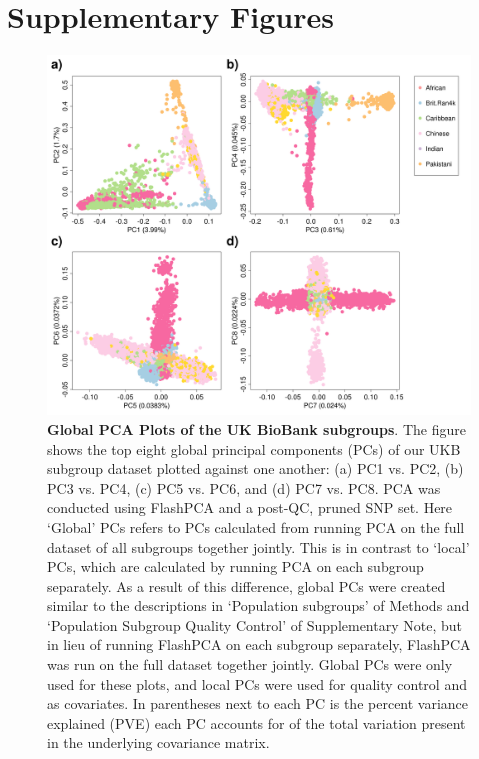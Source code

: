 \documentclass[12pt,a4paper]{article}
\begin{document}
\clearpage


\section{Supplementary Figures}\label{Supplementary-Figures}

\renewcommand{\figurename}{Supplementary Figure}
\renewcommand{\tablename}{Supplementary Table}
\setcounter{figure}{0}
\setcounter{table}{0}

\begin{figure}[htbp]
\centering
\hspace*{-1cm}
\includegraphics[scale=.4]{Images/Supp/InterPath_Supp_Figure_UKB_PCAPlot_vs2.png}
\caption[TBD]{\textbf{Global PCA Plots of the UK BioBank subgroups}. The figure shows the top eight global principal components (PCs) of our UKB subgroup dataset plotted against one another: (a) PC1 vs. PC2, (b) PC3 vs. PC4, (c) PC5 vs. PC6, and (d) PC7 vs. PC8. PCA was conducted using FlashPCA \citep{Abraham2017} and a post-QC, pruned SNP set. Here `Global' PCs refers to PCs calculated from running PCA on the full dataset of all subgroups together jointly. This is in contrast to `local' PCs, which are calculated by running PCA on each subgroup separately. As a result of this difference, global PCs were created similar to the descriptions in `Population subgroups' of Methods and `Population Subgroup Quality Control' of Supplementary Note, but in lieu of running FlashPCA on each subgroup separately, FlashPCA was run on the full dataset together jointly. Global PCs were only used for these plots, and local PCs were used for quality control and as covariates. In parentheses next to each PC is the percent variance explained (PVE) each PC accounts for of the total variation present in the underlying covariance matrix.}
\label{InterPath-Supp-Figure-UKB-subgroups-PCAPlot}
\end{figure}
\clearpage
\end{document}
